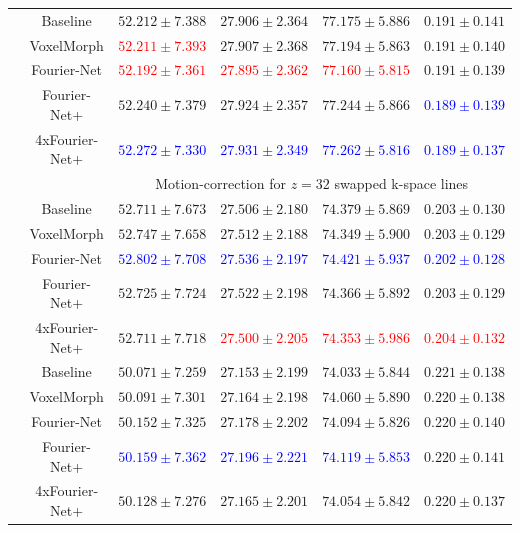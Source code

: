 \begin{table}[h]
\begin{tabular}{c c c c c c}
		\midrule		
		\multirow{5}{*}{\rotatebox{90}{$R=10$}} & Baseline & $52.212 \pm 7.388$ & $27.906 \pm 2.364$ & $77.175 \pm 5.886$ & $0.191 \pm 0.141$ \\  
		 & VoxelMorph & \textcolor{red}{$52.211 \pm 7.393$} & $27.907 \pm 2.368$ & $77.194 \pm 5.863$ & $0.191 \pm 0.140$ \\  
		 & Fourier-Net & \textcolor{red}{$52.192 \pm 7.361$} & \textcolor{red}{$27.895 \pm 2.362$} & \textcolor{red}{$77.160 \pm 5.815$} & $0.191 \pm 0.139$ \\  
		 & Fourier-Net+ & $52.240 \pm 7.379$ & $27.924 \pm 2.357$ & $77.244 \pm 5.866$ & \textcolor{blue}{$0.189 \pm 0.139$} \\   
		 & 4xFourier-Net+ & \textcolor{blue}{$52.272 \pm 7.330$} & \textcolor{blue}{$27.931 \pm 2.349$} & \textcolor{blue}{$77.262 \pm 5.816$} & \textcolor{blue}{$0.189 \pm 0.137$} \\ 
		 
		 \midrule	
		 & & \multicolumn{4}{c}{Motion-correction for $z=32$ swapped k-space lines} \\
		\midrule
		\multirow{5}{*}{\rotatebox{90}{$R=4$}} & Baseline & $52.711 \pm 7.673$ & $27.506 \pm 2.180$ & $74.379 \pm 5.869$ & $0.203 \pm 0.130$ \\  
		 & VoxelMorph & $52.747 \pm 7.658$ & $27.512 \pm 2.188$ & $74.349 \pm 5.900$ & $0.203 \pm 0.129$ \\  
		 & Fourier-Net & \textcolor{blue}{$52.802 \pm 7.708$} & \textcolor{blue}{$27.536 \pm 2.197$} & \textcolor{blue}{$74.421 \pm 5.937$} & \textcolor{blue}{$0.202 \pm 0.128$} \\  
		 & Fourier-Net+ & $52.725 \pm 7.724$ & $27.522 \pm 2.198$ & $74.366 \pm 5.892$ & $0.203 \pm 0.129$ \\   
		 & 4xFourier-Net+ & $52.711 \pm 7.718$ & \textcolor{red}{$27.500 \pm 2.205$} & \textcolor{red}{$74.353 \pm 5.986$} & \textcolor{red}{$0.204 \pm 0.132$} \\  
		
		\midrule
		\multirow{5}{*}{\rotatebox{90}{$R=8$}} & Baseline & $50.071 \pm 7.259$ & $27.153 \pm 2.199$ & $74.033 \pm 5.844$ & $0.221 \pm 0.138$ \\  
		 & VoxelMorph & $50.091 \pm 7.301$ & $27.164 \pm 2.198$ & $74.060 \pm 5.890$ & $0.220 \pm 0.138$ \\  
		 & Fourier-Net & $50.152 \pm 7.325$ & $27.178 \pm 2.202$ & $74.094 \pm 5.826$ & $0.220 \pm 0.140$ \\  
		 & Fourier-Net+ & \textcolor{blue}{$50.159 \pm 7.362$} & \textcolor{blue}{$27.196 \pm 2.221$} & \textcolor{blue}{$74.119 \pm 5.853$} & $0.220 \pm 0.141$ \\   
		 & 4xFourier-Net+ & $50.128 \pm 7.276$ & $27.165 \pm 2.201$ & $74.054 \pm 5.842$ & $0.220 \pm 0.137$ \\ 
		 	 

\end{tabular}
\end{table}
